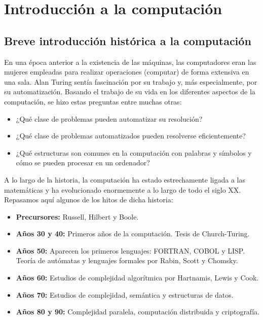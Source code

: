 \chapter{Introducción a la computación}\label{introduccion-a-la-computacion}

\section{Breve introducción histórica a la computación}

En una época anterior a la existencia de las máquinas, las computadores eran las mujeres empleadas para realizar operaciones (computar) de forma extensiva en una sala.
Alan Turing sentía fascinación por su trabajo y, más especialmente, por su automatización.
Basando el trabajo de su vida en los diferentes aspectos de la computación, se hizo estas preguntas entre muchas otras:

\begin{itemize}
	\item ¿Qué clase de problemas pueden automatizar su resolución?
	\item ¿Qué clase de problemas automatizados pueden resolverse eficientemente?
	\item ¿Qué estructuras son comunes en la computación con palabras y símbolos y cómo se pueden procesar en un ordenador?
\end{itemize}

A lo largo de la historia, la computación ha estado estrechamente ligada a las matemáticas y ha evolucionado enormemente a lo largo de todo el siglo XX\@.
Repasamos aquí algunos de los hitos de dicha historia:

\begin{itemize}
	\item\textbf{Precursores:} Russell, Hilbert y Boole.
	\item\textbf{Años 30 y 40:} Primeros años de la computación. Tesis de Church-Turing.
	\item\textbf{Años 50:} Aparecen los primeros lenguajes: FORTRAN, COBOL y LISP\@. Teoría de autómatas y lenguajes formales por Rabin, Scott y Chomsky.
	\item\textbf{Años 60:} Estudios de complejidad algorítmica por Hartnamis, Lewis y Cook.
	\item\textbf{Años 70:} Estudios de complejidad, semántica y estructuras de datos.
	\item\textbf{Años 80 y 90:} Complejidad paralela, computación distribuida y criptografía.
\end{itemize}

